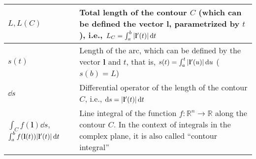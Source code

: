 \begin{xltabular}{\textwidth}{XX}
	\(L, L(C)\)                                                                                                                                                                                                                                                                                        & Total length of the contour \(C\) (which can be defined the vector \(\mathbf{l}\), parametrized by \(t\)), i.e., \(L_C = \int_a^b \abs{\mathbf{l}'(t)} \dd{t}\)\cite{stewartCalculus2011}                                                                                                                                           \\ \hline
	\(s(t)\)                                                                                                                                                                                                                                                                                           & Length of the arc, which can be defined by the vector \(\mathbf{l}\) and \(t\), that is, \(s(t) = \int_a^t \abs{\mathbf{l}'(u)} \dd{u}\) (\(s(b) = L\))\cite{stewartCalculus2011}                                                                                                                                                   \\ \hline
	\(\dd{s}\)                                                                                                                                                                                                                                                                                         & Differential operator of the length of the contour \(C\), i.e., \(\dd{s} = \abs{\mathbf{l}'(t)} \dd{t}\) \cite{stewartCalculus2011}                                                                                                                                                                                                 \\ \hline
	\(\int_C f(\mathbf{l}) \dd{s}\), \(\int_a^b f(\mathbf{l}(t)) \abs{\mathbf{l}'(t)} \dd{t}\)                                                                                                                                                                                                         & Line integral of the function \(f: \mathbb{R}^{n} \rightarrow \mathbb{R}\) along the contour \(C\). In the context of integrals in the complex plane, it is also called ``contour integral''                                                                                                                                        \\ \hline

\end{xltabular}
